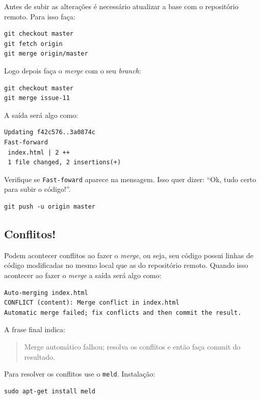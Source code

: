 Antes de subir as alterações é necessário atualizar a base com o
repositório remoto. Para isso faça:

\begin{verbatim}
git checkout master
git fetch origin
git merge origin/master
\end{verbatim}

Logo depois faça o \emph{merge} com o seu \emph{branch}:

\begin{verbatim}
git checkout master
git merge issue-11
\end{verbatim}

A saída será algo como:

\begin{verbatim}
Updating f42c576..3a0874c
Fast-forward
 index.html | 2 ++
 1 file changed, 2 insertions(+)
\end{verbatim}

Verifique se \texttt{Fast-foward} aparece na mensagem. Isso quer dizer:
``Ok, tudo certo para subir o código!''.

\begin{verbatim}
git push -u origin master
\end{verbatim}

\subsection{Conflitos!}\label{conflitos}

Podem acontecer conflitos ao fazer o \emph{merge}, ou seja, seu código
possui linhas de código modificadas no mesmo local que as do repositório
remoto. Quando isso acontecer ao fazer o \emph{merge} a saída será algo
como:

\begin{verbatim}
Auto-merging index.html
CONFLICT (content): Merge conflict in index.html
Automatic merge failed; fix conflicts and then commit the result.
\end{verbatim}

A frase final indica:

\begin{quote}
Merge automático falhou; resolva os conflitos e então faça commit do
resultado.
\end{quote}

Para resolver os conflitos use o \texttt{meld}. Instalação:

\begin{verbatim}
sudo apt-get install meld
\end{verbatim}


